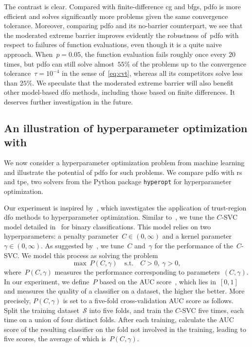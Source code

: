 \documentclass{article}
\numberwithin{equation}{section}
\theoremstyle{definition}
\theoremstyle{plain}
\theoremstyle{remark}
\newcommand{\st}{\text{s.t.}}
\begin{document}
The contrast is clear.
Compared with finite-difference \gls{cg} and \gls{bfgs}, \gls{pdfo} is more efficient and solves significantly more problems given the same convergence tolerance.
Moreover, comparing \gls{pdfo} and its no-barrier counterpart, we see that the moderated extreme barrier improves evidently the robustness of~\gls{pdfo} with respect to failures of function evaluations, even though it is a quite naive approach.
When~$p = 0.05$, the function evaluation fails roughly once every $20$ times, but \gls{pdfo} can still solve almost~$55\%$ of the problems up to the convergence tolerance~$\tau = 10^{-4}$ in the sense of~\eqref{eq:cvt}, whereas all its competitors solve less than $25\%$.
We speculate that the moderated extreme barrier will also benefit other model-based \gls{dfo} methods, including those based on finite differences.
It deserves further investigation in the future.

\subsection{An illustration of hyperparameter optimization with~}
\label{ssec:hypertune}

We now consider a hyperparameter optimization problem from machine learning and illustrate the potential of \gls{pdfo} for such problems.
We compare \gls{pdfo} with \gls{rs} and \gls{tpe}, two solvers from the Python package \texttt{hyperopt} for hyperparameter optimization.

Our experiment is inspired by~\cite[\S~5.3]{Ghanbari_Scheinberg_2017}, which investigates the application of trust-region \gls{dfo} methods to hyperparameter optimization.
Similar to~\cite[\S~5.3]{Ghanbari_Scheinberg_2017}, we tune the $C$-SVC model detailed in~\cite[\S~2.1]{Chang_Lin_2011} for binary classifications.
This model relies on two hyperparameters: a penalty parameter~$C \in (0, \infty)$ and a kernel parameter~$\gamma \in (0, \infty)$.
As suggested by~\cite[\S~9]{Chang_Lin_2011}, we tune~$C$ and~$\gamma$ for the performance of the~$C$-SVC.
We model this process as solving the problem
\begin{equation}
    \label{eq:hypertune}
    \max ~ P(C, \gamma) \quad \st \quad C > 0, ~ \gamma > 0,
\end{equation}
where~$P(C, \gamma)$ measures the performance corresponding to parameters~$(C, \gamma)$.
In our experiment, we define~$P$ based on the AUC score~\cite[\S~3]{Ghanbari_Scheinberg_2017}, which lies in~$[0,1]$ and measures the quality of a classifier on a dataset, the higher the better.
More precisely, $P(C, \gamma)$ is set to a five-fold cross-validation AUC score as follows.
Split the training dataset~$\mathcal{S}$ into five folds, and train the $C$-SVC five times, each time on a union of four distinct folds.
After each training, calculate the AUC score of the resulting classifier on the fold not involved in the training, leading to five scores, the average of which is~$P(C, \gamma)$.
\end{document}
